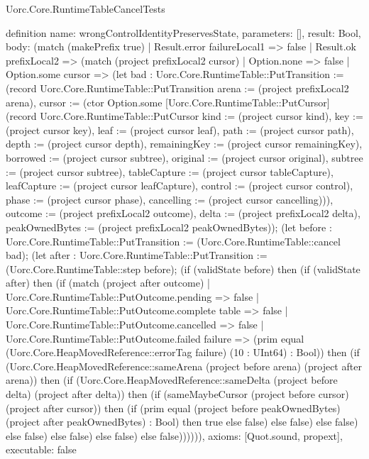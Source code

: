 \begin{lexlean}{Uorc.Core.RuntimeTableCancelTests}
\begin{semanticmodule}
definition{
  name: wrongControlIdentityPreservesState,
  parameters: [],
  result: Bool,
  body: (match (makePrefix true)
    | Result.error failureLocal1 => false
    | Result.ok prefixLocal2 => (match (project prefixLocal2 cursor)
      | Option.none => false
      | Option.some cursor => (let bad : Uorc.Core.RuntimeTable::PutTransition := (record Uorc.Core.RuntimeTable::PutTransition {arena := (project prefixLocal2 arena), cursor := (ctor Option.some [Uorc.Core.RuntimeTable::PutCursor] (record Uorc.Core.RuntimeTable::PutCursor {kind := (project cursor kind), key := (project cursor key), leaf := (project cursor leaf), path := (project cursor path), depth := (project cursor depth), remainingKey := (project cursor remainingKey), borrowed := (project cursor subtree), original := (project cursor original), subtree := (project cursor subtree), tableCapture := (project cursor tableCapture), leafCapture := (project cursor leafCapture), control := (project cursor control), phase := (project cursor phase), cancelling := (project cursor cancelling)})), outcome := (project prefixLocal2 outcome), delta := (project prefixLocal2 delta), peakOwnedBytes := (project prefixLocal2 peakOwnedBytes)}); (let before : Uorc.Core.RuntimeTable::PutTransition := (Uorc.Core.RuntimeTable::cancel bad); (let after : Uorc.Core.RuntimeTable::PutTransition := (Uorc.Core.RuntimeTable::step before); (if (validState before) then (if (validState after) then (if (match (project after outcome)
        | Uorc.Core.RuntimeTable::PutOutcome.pending => false
        | Uorc.Core.RuntimeTable::PutOutcome.complete table => false
        | Uorc.Core.RuntimeTable::PutOutcome.cancelled => false
        | Uorc.Core.RuntimeTable::PutOutcome.failed failure => (prim equal (Uorc.Core.HeapMovedReference::errorTag failure) (10 : UInt64) : Bool)) then (if (Uorc.Core.HeapMovedReference::sameArena (project before arena) (project after arena)) then (if (Uorc.Core.HeapMovedReference::sameDelta (project before delta) (project after delta)) then (if (sameMaybeCursor (project before cursor) (project after cursor)) then (if (prim equal (project before peakOwnedBytes) (project after peakOwnedBytes) : Bool) then true else false) else false) else false) else false) else false) else false) else false)))))),
  axioms: [Quot.sound, propext],
  executable: false
}


\end{semanticmodule}
\end{lexlean}

